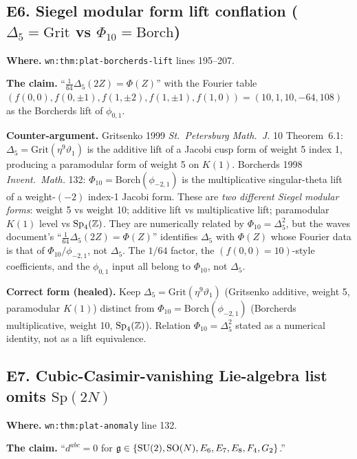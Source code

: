 \subsection*{E6. Siegel modular form lift conflation
($\Delta_5 = \mathrm{Grit}$ vs $\Phi_{10} = \mathrm{Borch}$)}
\label{wn:subsec:E6-siegel-lift-conflation}

\textbf{Where.} \verb|wn:thm:plat-borcherds-lift| lines 195--207.

\textbf{The claim.} ``$\tfrac{1}{64} \Delta_5(2Z) = \Phi(Z)$'' with the
Fourier table $(f(0, 0), f(0, \pm 1), f(1, \pm 2), f(1, \pm 1), f(1, 0))
= (10, 1, 10, -64, 108)$ as the Borcherds lift of $\phi_{0, 1}$.

\textbf{Counter-argument.} Gritsenko 1999 \emph{St.~Petersburg Math.~J.}
10 Theorem~6.1: $\Delta_5 = \mathrm{Grit}(\eta^9 \vartheta_1)$ is the
additive lift of a Jacobi cusp form of weight 5 index 1, producing a
paramodular form of weight 5 on $K(1)$. Borcherds 1998 \emph{Invent.\
Math.} 132: $\Phi_{10} = \mathrm{Borch}(\phi_{-2, 1})$ is the
multiplicative singular-theta lift of a weight-$(-2)$ index-1 Jacobi
form. These are \emph{two different Siegel modular forms}:
weight 5 vs weight 10; additive lift vs multiplicative lift; paramodular
$K(1)$ level vs $\mathrm{Sp}_4(\mathbb{Z})$. They are numerically related by
$\Phi_{10} = \Delta_5^2$, but the waves document's ``$\tfrac{1}{64}
\Delta_5(2Z) = \Phi(Z)$'' identifies $\Delta_5$ with $\Phi(Z)$ whose
Fourier data is that of $\Phi_{10}/\phi_{-2, 1}$, not $\Delta_5$. The
$1/64$ factor, the $(f(0, 0) = 10)$-style coefficients, and the
$\phi_{0, 1}$ input all belong to $\Phi_{10}$, not $\Delta_5$.

\textbf{Correct form (healed).} Keep $\Delta_5 = \mathrm{Grit}(\eta^9
\vartheta_1)$ (Gritsenko additive, weight 5, paramodular $K(1)$)
distinct from $\Phi_{10} = \mathrm{Borch}(\phi_{-2, 1})$ (Borcherds
multiplicative, weight 10, $\mathrm{Sp}_4(\mathbb{Z})$). Relation
$\Phi_{10} = \Delta_5^2$ stated as a numerical identity, not as a lift
equivalence.

\subsection*{E7. Cubic-Casimir-vanishing Lie-algebra list omits
$\mathrm{Sp}(2N)$}
\label{wn:subsec:E7-cubic-casimir-list}

\textbf{Where.} \verb|wn:thm:plat-anomaly| line 132.

\textbf{The claim.} ``$d^{abc} = 0$ for $\mathfrak{g} \in \{\mathrm{SU}(2),
\mathrm{SO}(N), E_6, E_7, E_8, F_4, G_2\}$.''

